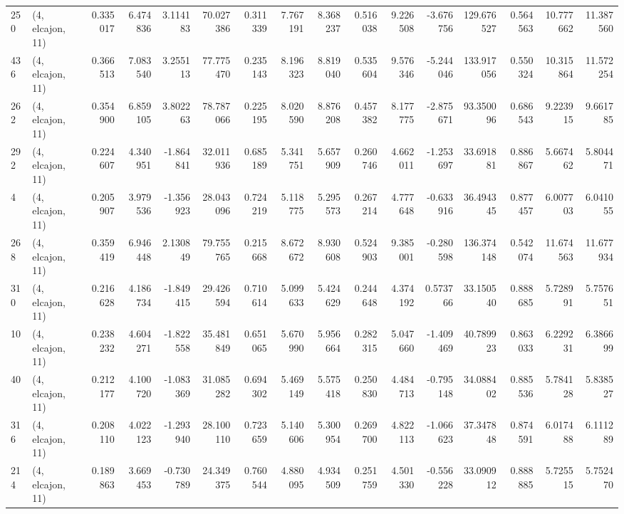 \begin{tabular}{llrrrrrrrrrrrrrr}
250 &  (4, elcajon, 11) &   0.335017 &   6.474836 &   3.114183 &    70.027386 &   0.311339 &   7.767191 &   8.368237 &  0.516038 &   9.226508 &  -3.676756 &   129.676527 &  0.564563 &  10.777662 &  11.387560 \\
436 &  (4, elcajon, 11) &   0.366513 &   7.083540 &   3.255113 &    77.775470 &   0.235143 &   8.196323 &   8.819040 &  0.535604 &   9.576346 &  -5.244046 &   133.917056 &  0.550324 &  10.315864 &  11.572254 \\
262 &  (4, elcajon, 11) &   0.354900 &   6.859105 &   3.802263 &    78.787066 &   0.225195 &   8.020590 &   8.876208 &  0.457382 &   8.177775 &  -2.875671 &    93.350096 &  0.686543 &   9.223915 &   9.661785 \\
292 &  (4, elcajon, 11) &   0.224607 &   4.340951 &  -1.864841 &    32.011936 &   0.685189 &   5.341751 &   5.657909 &  0.260746 &   4.662011 &  -1.253697 &    33.691881 &  0.886867 &   5.667462 &   5.804471 \\
4   &  (4, elcajon, 11) &   0.205907 &   3.979536 &  -1.356923 &    28.043096 &   0.724219 &   5.118775 &   5.295573 &  0.267214 &   4.777648 &  -0.633916 &    36.494345 &  0.877457 &   6.007703 &   6.041055 \\
268 &  (4, elcajon, 11) &   0.359419 &   6.946448 &   2.130849 &    79.755765 &   0.215668 &   8.672672 &   8.930608 &  0.524903 &   9.385001 &  -0.280598 &   136.374148 &  0.542074 &  11.674563 &  11.677934 \\
310 &  (4, elcajon, 11) &   0.216628 &   4.186734 &  -1.849415 &    29.426594 &   0.710614 &   5.099633 &   5.424629 &  0.244648 &   4.374192 &   0.573766 &    33.150540 &  0.888685 &   5.728991 &   5.757651 \\
10  &  (4, elcajon, 11) &   0.238232 &   4.604271 &  -1.822558 &    35.481849 &   0.651065 &   5.670990 &   5.956664 &  0.282315 &   5.047660 &  -1.409469 &    40.789923 &  0.863033 &   6.229231 &   6.386699 \\
40  &  (4, elcajon, 11) &   0.212177 &   4.100720 &  -1.083369 &    31.085282 &   0.694302 &   5.469149 &   5.575418 &  0.250830 &   4.484713 &  -0.795148 &    34.088402 &  0.885536 &   5.784128 &   5.838527 \\
316 &  (4, elcajon, 11) &   0.208110 &   4.022123 &  -1.293940 &    28.100110 &   0.723659 &   5.140606 &   5.300954 &  0.269700 &   4.822113 &  -1.066623 &    37.347848 &  0.874591 &   6.017488 &   6.111289 \\
214 &  (4, elcajon, 11) &   0.189863 &   3.669453 &  -0.730789 &    24.349375 &   0.760544 &   4.880095 &   4.934509 &  0.251759 &   4.501330 &  -0.556228 &    33.090912 &  0.888885 &   5.725515 &   5.752470 \\

\end{tabular}
